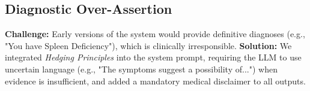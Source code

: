 \subsection{Diagnostic Over-Assertion}
\textbf{Challenge:} Early versions of the system would provide definitive diagnoses (e.g., "You have Spleen Deficiency"), which is clinically irresponsible.
\textbf{Solution:} We integrated \textit{Hedging Principles} into the system prompt, requiring the LLM to use uncertain language (e.g., "The symptoms suggest a possibility of...") when evidence is insufficient, and added a mandatory medical disclaimer to all outputs.
